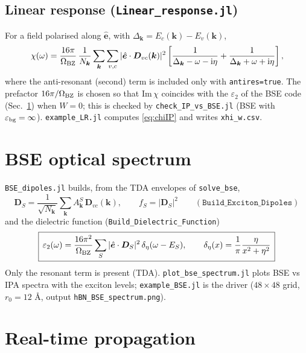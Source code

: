\documentclass[11pt,a4paper]{article}
\newcommand{\ii}{\mathrm{i}}
\newcommand{\kk}{\bm{k}}
\newcommand{\hate}{\hat{\bm{e}}}
\newcommand{\code}[1]{\texttt{#1}}
\newcommand{\Nk}{N_{\bm k}}
\begin{document}
\subsection{Linear response (\code{Linear\_response.jl})}
For a field polarised along $\hate$, with $\Delta_{\kk}=E_c(\kk)-E_v(\kk)$,
\begin{equation}
\chi(\omega)=\frac{16\pi}{\Omega_{\rm BZ}}\,\frac{1}{\Nk}\sum_{\kk}\sum_{v,c}|\hate\cdot\bm D_{vc}(\kk)|^2
\left[\frac{1}{\Delta_{\kk}-\omega-\ii\eta}+\frac{1}{\Delta_{\kk}+\omega+\ii\eta}\right],
\label{eq:chiIP}
\end{equation}
where the anti-resonant (second) term is included only with \code{antires=true}. The prefactor $16\pi/\Omega_{\rm BZ}$ is chosen so that
$\mathrm{Im}\,\chi$ coincides with the $\varepsilon_2$ of the BSE code (Sec.~\ref{sec:bsespec}) when $W=0$; this is checked by \code{check\_IP\_vs\_BSE.jl}
(BSE with $\varepsilon_{\rm bg}=\infty$). \code{example\_LR.jl} computes \eqref{eq:chiIP} and writes \code{xhi\_w.csv}.

\section{BSE optical spectrum}
\label{sec:bsespec}
\code{BSE\_dipoles.jl} builds, from the TDA envelopes of \code{solve\_bse},
\begin{equation}
\bm D_S=\frac{1}{\sqrt{\Nk}}\sum_{\kk}A^S_{\kk}\,\bm D_{vc}(\kk),\qquad f_S=|\bm D_S|^2
\qquad(\code{Build\_Exciton\_Dipoles})
\end{equation}
and the dielectric function (\code{Build\_Dielectric\_Function})
\begin{equation}
\boxed{\,\varepsilon_2(\omega)=\frac{16\pi^2}{\Omega_{\rm BZ}}\sum_S|\hate\cdot\bm D_S|^2\,\delta_\eta(\omega-E_S),\qquad
\delta_\eta(x)=\frac{1}{\pi}\frac{\eta}{x^2+\eta^2}\,}
\label{eq:eps2}
\end{equation}
Only the resonant term is present (TDA). \code{plot\_bse\_spectrum.jl} plots BSE vs IPA spectra with the exciton levels; \code{example\_BSE.jl}
is the driver ($48\times48$ grid, $r_0=12$ \AA, output \code{hBN\_BSE\_spectrum.png}).

\section{Real-time propagation}
\label{sec:rt}
\end{document}
